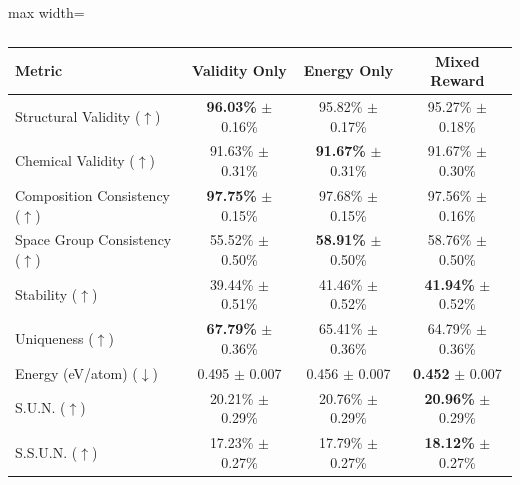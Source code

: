 \begin{table}[t]
\centering
\color{red}
\caption{}
\label{tab:reward_comparison}
\small
\begin{adjustbox}{max width=\linewidth}
\begin{tabular}{@{}lccc@{}}
\toprule
\textbf{Metric} & \textbf{Validity Only} & \textbf{Energy Only} & \textbf{Mixed Reward} \\
\midrule
Structural Validity ($\uparrow$) & \textbf{96.03\%} $\pm$ 0.16\% & 95.82\% $\pm$ 0.17\% & 95.27\% $\pm$ 0.18\% \\
Chemical Validity ($\uparrow$) & 91.63\% $\pm$ 0.31\% & \textbf{91.67\%} $\pm$ 0.31\% & 91.67\% $\pm$ 0.30\% \\
Composition Consistency ($\uparrow$) & \textbf{97.75\%} $\pm$ 0.15\% & 97.68\% $\pm$ 0.15\% & 97.56\% $\pm$ 0.16\% \\
Space Group Consistency ($\uparrow$) & 55.52\% $\pm$ 0.50\% & \textbf{58.91\%} $\pm$ 0.50\% & 58.76\% $\pm$ 0.50\% \\
Stability ($\uparrow$) & 39.44\% $\pm$ 0.51\% & 41.46\% $\pm$ 0.52\% & \textbf{41.94\%} $\pm$ 0.52\% \\
Uniqueness ($\uparrow$) & \textbf{67.79\%} $\pm$ 0.36\% & 65.41\% $\pm$ 0.36\% & 64.79\% $\pm$ 0.36\% \\
Energy (eV/atom) ($\downarrow$) & 0.495 $\pm$ 0.007 & 0.456 $\pm$ 0.007 & \textbf{0.452} $\pm$ 0.007 \\
S.U.N. ($\uparrow$) & 20.21\% $\pm$ 0.29\% & 20.76\% $\pm$ 0.29\% & \textbf{20.96\%} $\pm$ 0.29\% \\
S.S.U.N. ($\uparrow$) & 17.23\% $\pm$ 0.27\% & 17.79\% $\pm$ 0.27\% & \textbf{18.12\%} $\pm$ 0.27\% \\
\bottomrule
\end{tabular}
\end{adjustbox}
\end{table}
